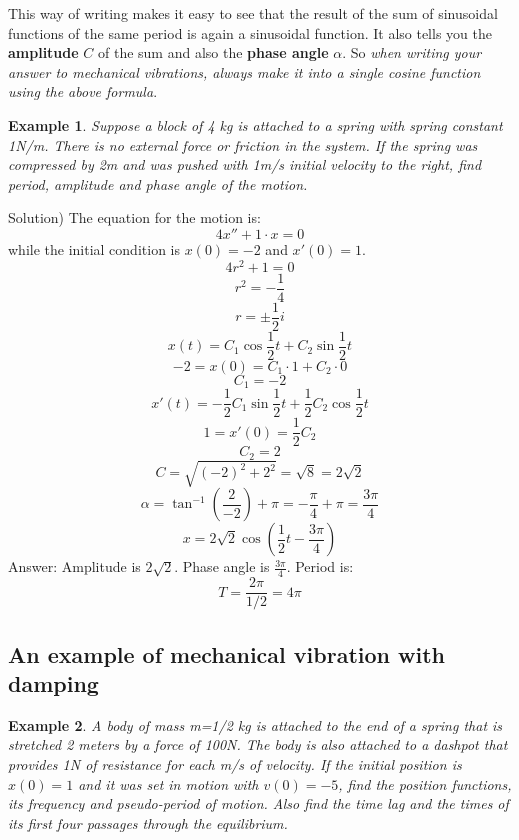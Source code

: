 \documentclass[12pt]{report}
\newtheorem{ex}{Example}[section]
\begin{document}
This way of writing makes it easy to see that the result of the sum of sinusoidal functions of the same period is again a sinusoidal function. It also tells you the \textbf{amplitude} $C$ of the sum and also the \textbf{phase angle} $\alpha$. So \textit{when writing your answer to mechanical vibrations, always make it into a single cosine function using the above formula}.

\begin{ex}
Suppose a block of 4 kg is attached to a spring with spring constant 1N/m. There is no external force or friction in the system. If the spring was compressed by 2m and was pushed with 1m/s initial velocity to the right, find period, amplitude and phase angle of the motion.
\end{ex}
Solution)
The equation for the motion is:
$$ 4 x''+ 1\cdot x =0$$
while the initial condition is $x(0)=-2$ and $x'(0)=1$.
$$4 r^2 + 1 = 0$$
$$r^2 = -\frac{1}{4}$$
$$r = \pm \frac{1}{2} i$$
$$x(t) = C_1 \cos{\frac{1}{2} t} + C_2 \sin{\frac{1}{2} t}$$
$$-2 = x(0) = C_1\cdot 1 + C_2 \cdot 0$$
$$C_1 = -2$$
$$x'(t) = -\frac{1}{2}C_1 \sin{\frac{1}{2} t} + \frac{1}{2}C_2 \cos{\frac{1}{2} t}$$
$$1= x'(0)=\frac{1}{2}C_2$$
$$C_2 = 2$$
$$C= \sqrt{(-2)^2 + 2^2} = \sqrt{8}=2\sqrt{2}$$
$$\alpha= \tan^{-1} \left(\frac{2}{-2}\right) + \pi = -\frac{\pi}{4}+\pi = \frac{3\pi}{4}$$
$$x = 2\sqrt{2} \cos{\left(\frac{1}{2} t -\frac{3\pi}{4}\right)}$$
Answer: Amplitude is $2\sqrt{2}$. Phase angle is $\frac{3\pi}{4}$. Period is:
$$T = \frac{2\pi}{1/2}=4\pi$$

\subsection*{An example of mechanical vibration with damping}
\begin{ex}
A body of mass m=1/2 kg is attached to the end of a spring that is stretched 2 meters by a force of 100N. The body is also attached to a dashpot that provides 1N of resistance for each m/s of velocity. If the initial position is $x(0)=1$ and it was set in motion with $v(0)=-5$, find the position functions, its frequency and pseudo-period of motion. Also find the time lag and the times of its first four passages through the equilibrium.
\end{ex}
\end{document}
